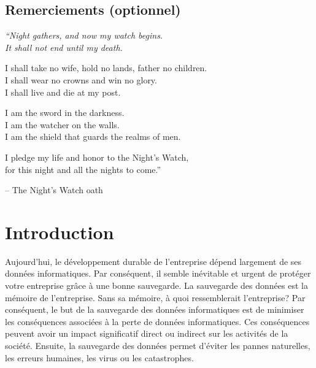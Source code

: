 \documentclass[pfe]{tnreport} %
\begin{document}
\maketitle
{}


\cleardoublepage

\makesecondtitle

\section*{Remerciements (optionnel)}

{\em
``Night gathers, and now my watch begins. \\
It shall not end until my death.

I shall take no wife, hold no lands, father no children. \\
I shall wear no crowns and win no glory. \\
I shall live and die at my post.

I am the sword in the darkness. \\
I am the watcher on the walls. \\
I am the shield that guards the realms of men.

I pledge my life and honor to the Night's Watch, \\
for this night and all the nights to come.''
}

\hspace{4cm} -- The Night's Watch oath


\cleardoublepage

\renewcommand{\baselinestretch}{0.5}\normalsize
\tableofcontents
\renewcommand{\baselinestretch}{1.0}\normalsize
\cleardoublepage

\setcounter{page}{1}

\chapter{Introduction}

Aujourd'hui, le développement durable de l'entreprise dépend largement de ses données informatiques. Par conséquent, il semble inévitable et urgent de protéger votre entreprise grâce à une bonne sauvegarde. La sauvegarde des données est la mémoire de l'entreprise. Sans sa mémoire, à quoi ressemblerait l'entreprise? 
Par conséquent, le but de la sauvegarde des données informatiques est de minimiser les conséquences associées à la perte de données informatiques. Ces conséquences peuvent avoir un impact significatif direct ou indirect sur les activités de la société. Ensuite, la sauvegarde des données permet d'éviter les pannes naturelles, les erreurs humaines, les virus ou les catastrophes.
\end{document}
